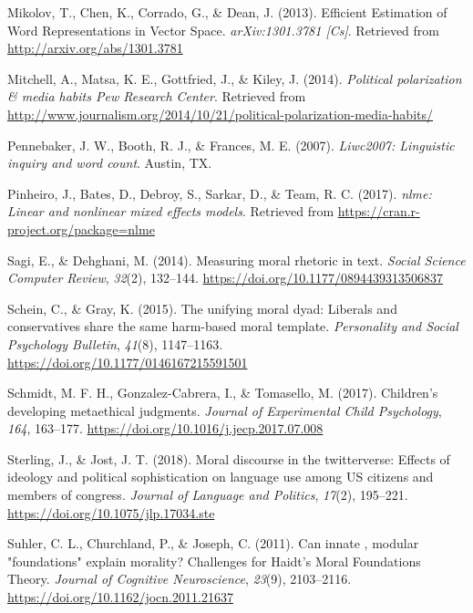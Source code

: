 \documentclass[
  man,floatsintext]{apa6}
\newlength{\cslhangindent}
\newlength{\cslentryspacingunit} %
\newenvironment{CSLReferences}[2] %
 {%
  \setlength{\parindent}{0pt}
  \ifodd #1
  \let\oldpar\par
  \def\par{\hangindent=\cslhangindent\oldpar}
  \fi
  \setlength{\parskip}{#2\cslentryspacingunit}
 }%
 {}
\begin{document}
\begin{CSLReferences}{1}{0}
\leavevmode{}%
Mikolov, T., Chen, K., Corrado, G., \& Dean, J. (2013). Efficient {Estimation} of {Word} {Representations} in {Vector} {Space}. \emph{arXiv:1301.3781 {[}Cs{]}}. Retrieved from \url{http://arxiv.org/abs/1301.3781}

\leavevmode{}%
Mitchell, A., Matsa, K. E., Gottfried, J., \& Kiley, J. (2014). \emph{{Political polarization {\&} media habits \textbar{} Pew Research Center}}. Retrieved from \url{http://www.journalism.org/2014/10/21/political-polarization-media-habits/}

\leavevmode{}%
Pennebaker, J. W., Booth, R. J., \& Frances, M. E. (2007). \emph{{Liwc2007: Linguistic inquiry and word count}}. Austin, TX.

\leavevmode{}%
Pinheiro, J., Bates, D., Debroy, S., Sarkar, D., \& Team, R. C. (2017). \emph{{nlme: Linear and nonlinear mixed effects models}}. Retrieved from \url{https://cran.r-project.org/package=nlme}

\leavevmode{}%
Sagi, E., \& Dehghani, M. (2014). Measuring moral rhetoric in text. \emph{Social Science Computer Review}, \emph{32}(2), 132--144. \url{https://doi.org/10.1177/0894439313506837}

\leavevmode{}%
Schein, C., \& Gray, K. (2015). The unifying moral dyad: Liberals and conservatives share the same harm-based moral template. \emph{Personality and Social Psychology Bulletin}, \emph{41}(8), 1147--1163. \url{https://doi.org/10.1177/0146167215591501}

\leavevmode{}%
Schmidt, M. F. H., Gonzalez-Cabrera, I., \& Tomasello, M. (2017). {Children's developing metaethical judgments}. \emph{Journal of Experimental Child Psychology}, \emph{164}, 163--177. \url{https://doi.org/10.1016/j.jecp.2017.07.008}

\leavevmode{}%
Sterling, J., \& Jost, J. T. (2018). Moral discourse in the twitterverse: Effects of ideology and political sophistication on language use among US citizens and members of congress. \emph{Journal of Language and Politics}, \emph{17}(2), 195--221. \url{https://doi.org/10.1075/jlp.17034.ste}

\leavevmode{}%
Suhler, C. L., Churchland, P., \& Joseph, C. (2011). Can innate , modular "foundations" explain morality? Challenges for {H}aidt's {M}oral {F}oundations {T}heory. \emph{Journal of Cognitive Neuroscience}, \emph{23}(9), 2103--2116. \url{https://doi.org/10.1162/jocn.2011.21637}


\end{CSLReferences}
\end{document}
